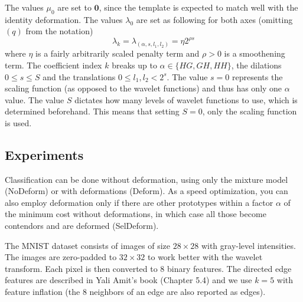 \documentclass{article}
\begin{document}
The values $\mu_0$ are set to $\mathbf{0}$, since the template is expected to match well with the identity deformation. The values $\lambda_0$ are set as following for both axes (omitting $(q)$ from the notation)
\[
    \lambda_{k} = \lambda_{(\alpha, s, l_1, l_2)} = \eta 2^{\rho s}
\]
where $\eta$ is a fairly arbitrarily scaled penalty term and $\rho > 0$ is a smoothening term. The coefficient index $k$ breaks up to $\alpha \in \{HG, GH, HH\}$, the dilations $0 \le s \le S$ and the translations $0 \le l_1, l_2 < 2^s$. The value $s = 0$ represents the scaling function (as opposed to the wavelet functions) and thus has only one $\alpha$ value. The value $S$ dictates how many levels of wavelet functions to use, which is determined beforehand. This means that setting $S=0$, only the scaling function is used.



\subsection{Experiments}
Classification can be done without deformation, using only the mixture model (NoDeform) or with deformations (Deform). As a speed optimization, you can also employ deformation only if there are other prototypes within a factor $\alpha$ of the minimum cost without deformations, in which case all those become contendors and are deformed (SelDeform).

The MNIST dataset consists of images of size $28 \times 28$ with gray-level intensities. The images are zero-padded to $32 \times 32$ to work better with the wavelet transform. Each pixel is then converted to 8 binary features. The directed edge features are described in Yali Amit's book (Chapter 5.4) and we use $k=5$ with feature inflation (the 8 neighbors of an edge are also reported as edges).
\end{document}
